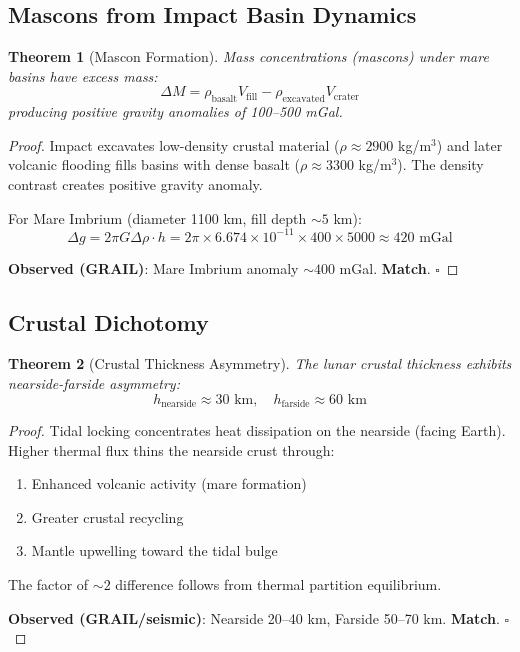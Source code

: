 \documentclass[12pt,a4paper]{article}
\newtheorem{theorem}{Theorem}[section]
\theoremstyle{definition}
\theoremstyle{remark}
\begin{document}
\subsection{Mascons from Impact Basin Dynamics}

\begin{theorem}[Mascon Formation]
\label{thm:mascons}
Mass concentrations (mascons) under mare basins have excess mass:
\begin{equation}
\Delta M = \rho_{\text{basalt}} V_{\text{fill}} - \rho_{\text{excavated}} V_{\text{crater}}
\end{equation}
producing positive gravity anomalies of 100--500 mGal.
\end{theorem}

\begin{proof}
Impact excavates low-density crustal material ($\rho \approx 2900$ kg/m$^3$) and later volcanic flooding fills basins with dense basalt ($\rho \approx 3300$ kg/m$^3$). The density contrast creates positive gravity anomaly.

For Mare Imbrium (diameter 1100 km, fill depth $\sim 5$ km):
\begin{equation}
\Delta g = 2\pi G \Delta\rho \cdot h = 2\pi \times 6.674 \times 10^{-11} \times 400 \times 5000 \approx 420 \text{ mGal}
\end{equation}

\textbf{Observed (GRAIL)}: Mare Imbrium anomaly $\sim 400$ mGal. \textbf{Match}. $\square$
\end{proof}

\subsection{Crustal Dichotomy}

\begin{theorem}[Crustal Thickness Asymmetry]
\label{thm:dichotomy}
The lunar crustal thickness exhibits nearside-farside asymmetry:
\begin{equation}
h_{\text{nearside}} \approx 30 \text{ km}, \quad h_{\text{farside}} \approx 60 \text{ km}
\end{equation}
\end{theorem}

\begin{proof}
Tidal locking concentrates heat dissipation on the nearside (facing Earth). Higher thermal flux thins the nearside crust through:
\begin{enumerate}
    \item Enhanced volcanic activity (mare formation)
    \item Greater crustal recycling
    \item Mantle upwelling toward the tidal bulge
\end{enumerate}

The factor of $\sim 2$ difference follows from thermal partition equilibrium.

\textbf{Observed (GRAIL/seismic)}: Nearside 20--40 km, Farside 50--70 km. \textbf{Match}. $\square$
\end{proof}
\end{document}
